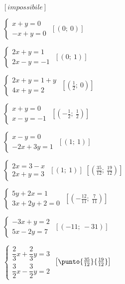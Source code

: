 \begin{esercizio}[\Ast]
\begin{multicols}{2}
\begin{enumeratea}
 \hfill \(\left[impossibile\right]\)
 \item \(\left\{\begin{array}{l}x+y=0\\-x+y=0\end{array}\right.\)
 \hfill \(\left[(0;~0)\right]\)
 \item \(\left\{\begin{array}{l}2x+y=1 \\2x-y=-1\end{array}\right.\)
 \hfill \(\left[(0;~1)\right]\)
 \item \(\left\{\begin{array}{l}2x+y=1+y\\4x+y=2\end{array}\right.\)
 \hfill \(\left[\left(\frac{1}{2};~0\right)\right]\)
 \item \(\left\{\begin{array}{l}x+y=0\\x-y=-1\end{array}\right.\)
 \hfill \(\left[\left(-{\frac{1}{2}};~\frac{1}{2}\right)\right]\)
 \item \(\left\{\begin{array}{l}x-y=0\\-2x+3y=1\end{array}\right.\)
 \hfill \(\left[(1;~1)\right]\)
 \item \(\left\{\begin{array}{l}2x=3-x\\2x+y=3\end{array}\right.\)
 \hfill \(\left[(1;~1)\right]\)
 \hfill \(\left[\left(\frac{35}{12};~\frac{19}{12}\right)\right]\)
 \item \(\left\{\begin{array}{l}5y+2x=1 \\3x+2y+2=0\end{array}\right.\)
 \hfill \(\left[\left(-{\frac{12}{11}};~\frac{7}{11}\right)\right]\)
 \item \(\left\{\begin{array}{l}-3x+y=2\\5x-2y=7\end{array}\right.\)
 \hfill \(\left[(-11;~-31)\right]\)
 \item \(\left\{\begin{array}{l}
 \dfrac{2}{3}x+\dfrac{2}{3}y=3\\
 \dfrac{3}{2}x-\dfrac{3}{2}y=2\end{array}\right.\)
 \hfill \(\left[\punto{\frac{35}{12}}{\frac{19}{12}}\right]\)

\end{enumeratea}
\end{multicols}
\end{esercizio}
